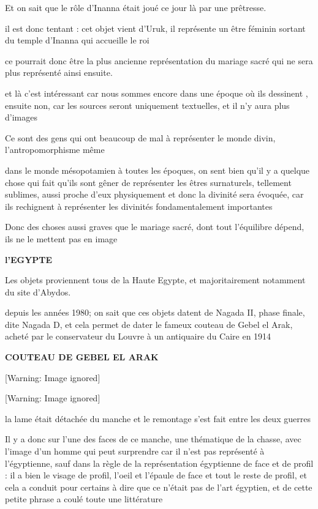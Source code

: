 \documentclass[a4paper,10pt]{article}
\begin{document}
\begin{itemize}
Et on sait que le rôle d'Inanna était joué ce jour là
par une prêtresse.

il est donc tentant : cet objet vient d'Uruk, il
représente un être féminin sortant du temple d'Inanna
qui accueille le roi

ce pourrait donc être la plus ancienne représentation  du mariage sacré
qui ne sera plus représenté ainsi ensuite.

et là c'est intéressant car nous sommes encore dans une
époque où ils dessinent , ensuite non, car les sources seront
uniquement textuelles, et il n'y aura plus
d'images

Ce sont des gens qui ont beaucoup de mal à représenter le monde divin,
l'antropomorphisme même 

dans le monde mésopotamien  à toutes les époques,  on sent bien
qu'il y a quelque chose qui fait
qu'ils sont gêner de représenter les  êtres
surnaturels, tellement sublimes, aussi proche d'eux
physiquement et donc la divinité sera évoquée, car ils rechignent à
représenter les divinités fondamentalement importantes

Donc des choses aussi graves que le mariage sacré, dont tout
l'équilibre dépend, ils ne le mettent pas en image

\textbf{ l'EGYPTE}

Les objets proviennent tous de la Haute Egypte, et majoritairement
notamment du site d'Abydos.

depuis les années 1980; on sait que ces objets datent de Nagada II,
phase finale, dite Nagada D, et cela permet de dater le fameux couteau
de Gebel el Arak, acheté par le conservateur du Louvre à un antiquaire
du Caire en 1914

\textbf{COUTEAU DE GEBEL EL ARAK\ \ }

  [Warning: Image ignored] %
 

  [Warning: Image ignored] %
 

la lame était détachée du manche et le remontage s'est
fait entre les deux guerres

Il y a donc sur l'une des faces de ce manche, une
thématique de la chasse, avec l'image
d'un homme qui peut surprendre car il
n'est pas représenté à l'égyptienne,
sauf dans la règle de la représentation égyptienne de face et de profil
: il a bien le visage de profil, l'oeil et
l'épaule  de face et tout le reste de profil, et cela
a conduit pour certains à dire que ce n'était pas de
l'art égyptien, et de cette petite phrase a coulé
toute une littérature


\end{itemize}
\end{document}
